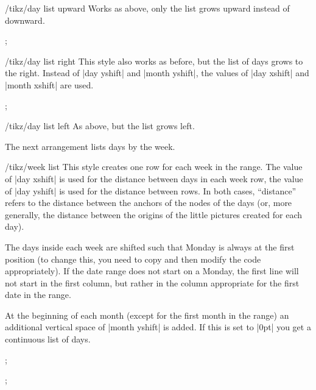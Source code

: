 \begin{stylekey}{/tikz/day list upward}
    Works as above, only the list grows upward instead of downward.
\begin{codeexample}[]
\tikz
  \calendar [dates=2000-01-28 to 2000-02-03,
             day list upward,month yshift=1em];
\end{codeexample}
\end{stylekey}

\begin{stylekey}{/tikz/day list right}
    This style also works as before, but the list of days grows to the right.
    Instead of |day yshift| and |month yshift|, the values of |day xshift| and
    |month xshift| are used.
\begin{codeexample}[]
\tikz
  \calendar [dates=2000-01-28 to 2000-02-03,
             day list right,month xshift=1em];
\end{codeexample}
\end{stylekey}

\begin{stylekey}{/tikz/day list left}
    As above, but the list grows left.
\end{stylekey}

The next arrangement lists days by the week.

\begin{stylekey}{/tikz/week list}
    This style creates one row for each week in the range. The value of
    |day xshift| is used for the distance between days in each week row, the
    value of |day yshift| is used for the distance between rows. In both cases,
    ``distance'' refers to the distance between the anchors of the nodes of the
    days (or, more generally, the distance between the origins of the little
    pictures created for each day).

    The days inside each week are shifted such that Monday is always at the
    first position (to change this, you need to copy and then modify the code
    appropriately). If the date range does not start on a Monday, the first
    line will not start in the first column, but rather in the column
    appropriate for the first date in the range.

    At the beginning of each month (except for the first month in the range) an
    additional vertical space of |month yshift| is added. If this is set to
    |0pt| you get a continuous list of days.
\begin{codeexample}[]
\tikz
  \calendar [dates=2000-01-01 to 2000-02-last,week list];
\end{codeexample}
\begin{codeexample}[]
\tikz
  \calendar [dates=2000-01-01 to 2000-02-last,week list,
             month yshift=0pt];
\end{codeexample}
\end{stylekey}

